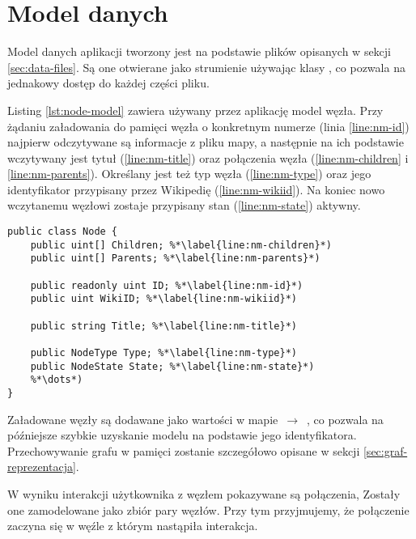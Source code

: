 \section{Model danych}

Model danych aplikacji tworzony jest na podstawie plików opisanych w sekcji \ref{sec:data-files}. Są one otwierane jako strumienie używając klasy , co pozwala na jednakowy dostęp do każdej części pliku. 

Listing \ref{lst:node-model} zawiera używany przez aplikację model węzła. Przy żądaniu załadowania do pamięci węzła o konkretnym numerze (linia \ref{line:nm-id}) najpierw odczytywane są informacje z pliku mapy, a następnie na ich podstawie wczytywany jest tytuł (\ref{line:nm-title}) oraz połączenia węzła (\ref{line:nm-children} i \ref{line:nm-parents}). Określany jest też typ węzła (\ref{line:nm-type}) oraz jego identyfikator przypisany przez Wikipedię (\ref{line:nm-wikiid}). Na koniec nowo wczytanemu węzłowi zostaje przypisany stan (\ref{line:nm-state}) aktywny.
\begin{lstlisting}[caption={Model węzła grafu}, label=lst:node-model]
public class Node {
	public uint[] Children; %*\label{line:nm-children}*)
	public uint[] Parents; %*\label{line:nm-parents}*)

	public readonly uint ID; %*\label{line:nm-id}*)
	public uint WikiID; %*\label{line:nm-wikiid}*)

	public string Title; %*\label{line:nm-title}*)

	public NodeType Type; %*\label{line:nm-type}*)
	public NodeState State; %*\label{line:nm-state}*)
	%*\dots*)
}
\end{lstlisting}

Załadowane węzły są dodawane jako wartości w mapie  $\,\to\,$ , co pozwala na późniejsze szybkie uzyskanie modelu na podstawie jego identyfikatora. Przechowywanie grafu w pamięci zostanie szczegółowo opisane w sekcji \ref{sec:graf-reprezentacja}.

W wyniku interakcji użytkownika z węzłem pokazywane są połączenia, Zostały one zamodelowane jako zbiór pary węzłów. Przy tym przyjmujemy, że połączenie zaczyna się w węźle z którym nastąpiła interakcja.
